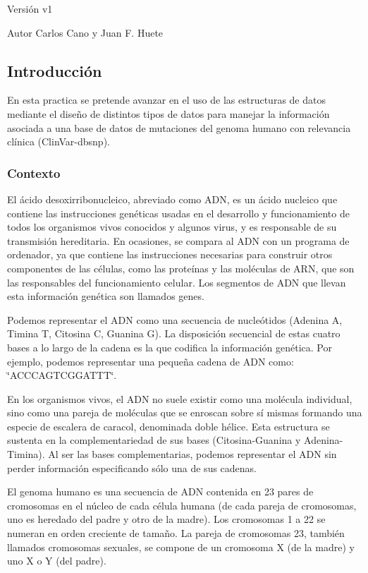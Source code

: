 \begin{DoxyVersion}{Versión}
v1 
\end{DoxyVersion}
\begin{DoxyAuthor}{Autor}
Carlos Cano y Juan F. Huete
\end{DoxyAuthor}
\hypertarget{index_introsec}{}\subsection{Introducción}\label{index_introsec}
En esta practica se pretende avanzar en el uso de las estructuras de datos mediante el diseño de distintos tipos de datos para manejar la información asociada a una base de datos de mutaciones del genoma humano con relevancia clínica (Clin\-Var-\/dbsnp).\hypertarget{index_background}{}\subsubsection{Contexto}\label{index_background}
El ácido desoxirribonucleico, abreviado como A\-D\-N, es un ácido nucleico que contiene las instrucciones genéticas usadas en el desarrollo y funcionamiento de todos los organismos vivos conocidos y algunos virus, y es responsable de su transmisión hereditaria. En ocasiones, se compara al A\-D\-N con un programa de ordenador, ya que contiene las instrucciones necesarias para construir otros componentes de las células, como las proteínas y las moléculas de A\-R\-N, que son las responsables del funcionamiento celular. Los segmentos de A\-D\-N que llevan esta información genética son llamados genes.

Podemos representar el A\-D\-N como una secuencia de nucleótidos (Adenina A, Timina T, Citosina C, Guanina G). La disposición secuencial de estas cuatro bases a lo largo de la cadena es la que codifica la información genética. Por ejemplo, podemos representar una pequeña cadena de A\-D\-N como\-: \char`\"{}\-A\-C\-C\-C\-A\-G\-T\-C\-G\-G\-A\-T\-T\-T\char`\"{}.

En los organismos vivos, el A\-D\-N no suele existir como una molécula individual, sino como una pareja de moléculas que se enroscan sobre sí mismas formando una especie de escalera de caracol, denominada doble hélice. Esta estructura se sustenta en la complementariedad de sus bases (Citosina-\/\-Guanina y Adenina-\/\-Timina). Al ser las bases complementarias, podemos representar el A\-D\-N sin perder información especificando sólo una de sus cadenas.

El genoma humano es una secuencia de A\-D\-N contenida en 23 pares de cromosomas en el núcleo de cada célula humana (de cada pareja de cromosomas, uno es heredado del padre y otro de la madre). Los cromosomas 1 a 22 se numeran en orden creciente de tamaño. La pareja de cromosomas 23, también llamados cromosomas sexuales, se compone de un cromosoma X (de la madre) y uno X o Y (del padre).

